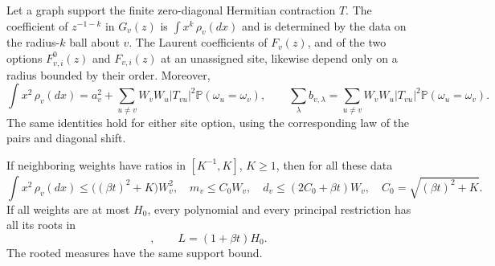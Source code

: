 \begin{lemma}\label{lem:rooted-locality}
Let a graph support the finite zero-diagonal Hermitian contraction \(T\).
The coefficient of \(z^{-1-k}\) in \(G_v(z)\) is
\(\int x^k\,\rho_v(dx)\) and is determined by the data on the radius-\(k\)
ball about \(v\).  The Laurent coefficients of \(F_v(z)\), and of the
two options \(F^0_{v,i}(z)\) and \(F_{v,i}(z)\) at an unassigned site,
likewise depend only on a radius bounded by their order.
Moreover,
\begin{equation}
 \int x^2\,\rho_v(dx)
 =a_v^2+\sum_{u\ne v}W_vW_u|T_{vu}|^2
                   \mathbb P(\omega_u=\omega_v),
 \qquad
 \sum_\lambda b_{v,\lambda}
 =\sum_{u\ne v}W_vW_u|T_{vu}|^2
                   \mathbb P(\omega_u=\omega_v).
 \label{eq:poly-second-moment}
\end{equation}
The same identities hold for either site option, using the corresponding
law of the pairs and diagonal shift.

If neighboring weights have ratios in \([K^{-1},K]\), \(K\geq1\), then
for all these data
\begin{equation}
 \int x^2\,\rho_v(dx)\leq\bigl((\beta t)^2+K\bigr)W_v^2,\quad
 m_v\leq C_0W_v,\quad d_v\leq(2C_0+\beta t)W_v,
 \quad C_0=\sqrt{(\beta t)^2+K}.
 \label{eq:poly-weight-bounds}
\end{equation}
If all weights are at most \(H_0\), every polynomial and every principal
restriction has all its roots in
\begin{equation}
                     [-L,L],\qquad L=(1+\beta t)H_0.
 \label{eq:poly-root-support}
\end{equation}
The rooted measures have the same support bound.
\end{lemma}

